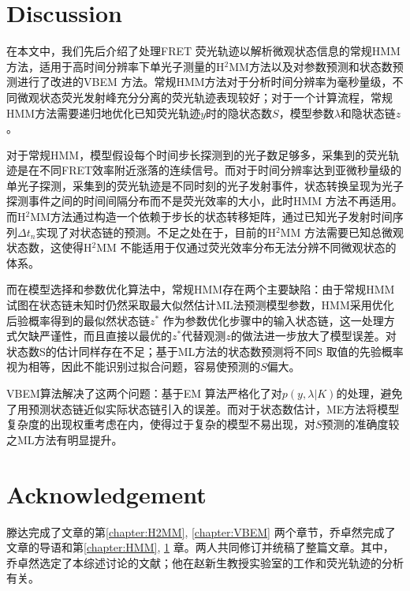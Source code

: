 \documentclass[11pt, a4paper]{article}
\begin{document}
\section{Discussion}\label{chapter:Discussion}
在本文中，我们先后介绍了处理FRET 荧光轨迹以解析微观状态信息的常规HMM方法，适用于高时间分辨率下单光子测量的H$^2$MM方法以及对参数预测和状态数预测进行了改进的VBEM 方法。常规HMM方法对于分析时间分辨率为毫秒量级，不同微观状态荧光发射峰充分分离的荧光轨迹表现较好；对于一个计算流程，常规HMM方法需要递归地优化已知荧光轨迹$y$时的隐状态数$S$，模型参数$\lambda$和隐状态链$z$。

对于常规HMM，模型假设每个时间步长探测到的光子数足够多，采集到的荧光轨迹是在不同FRET效率附近涨落的连续信号。而对于时间分辨率达到亚微秒量级的单光子探测，采集到的荧光轨迹是不同时刻的光子发射事件，状态转换呈现为光子探测事件之间的时间间隔分布而不是荧光效率的大小，此时HMM 方法不再适用。而H$^2$MM方法通过构造一个依赖于步长的状态转移矩阵，通过已知光子发射时间序列$\Delta t_n$实现了对状态链的预测。不足之处在于，目前的H$^2$MM 方法需要已知总微观状态数，这使得H$^2$MM 不能适用于仅通过荧光效率分布无法分辨不同微观状态的体系。

而在模型选择和参数优化算法中，常规HMM存在两个主要缺陷：由于常规HMM 试图在状态链未知时仍然采取最大似然估计ML法预测模型参数，HMM采用优化后验概率得到的最似然状态链$z^*$ 作为参数优化步骤中的输入状态链，这一处理方式欠缺严谨性，而且直接以最优的$z^*$代替观测$z$的做法进一步放大了模型误差。对状态数S的估计同样存在不足；基于ML方法的状态数预测将不同S 取值的先验概率视为相等，因此不能识别过拟合问题，容易使预测的$S$偏大。

VBEM算法解决了这两个问题：基于EM 算法严格化了对$p(y,\lambda|K)$的处理，避免了用预测状态链近似实际状态链引入的误差。而对于状态数估计，ME方法将模型复杂度的出现权重考虑在内，使得过于复杂的模型不易出现，对$S$预测的准确度较之ML方法有明显提升。


\section{Acknowledgement}
    滕达完成了文章的第\ref{chapter:H2MM}, \ref{chapter:VBEM} 两个章节，乔卓然完成了文章的导语和第\ref{chapter:HMM}, \ref{chapter:Discussion} 章。两人共同修订并统稿了整篇文章。其中，乔卓然选定了本综述讨论的文献；他在赵新生教授实验室的工作和荧光轨迹的分析有关。


\small


\end{document}
